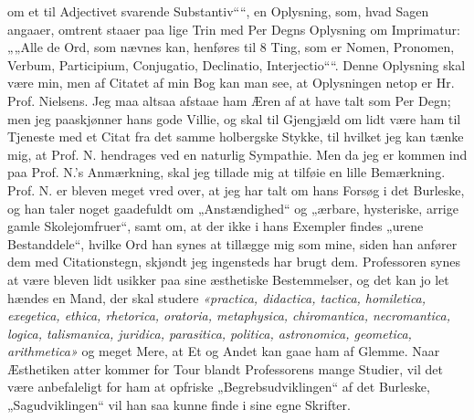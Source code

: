 \documentclass[12pt,a4paper]{book}
\newcommand{\opage}[1]{\marginnote{\footnotesize\textit{[#1]}}}
\begin{document}
om et til Adjectivet svarende Substantiv““, en Oplysning, som, hvad Sagen
angaaer, omtrent staaer paa lige Trin med Per Degns Oplysning om Imprimatur:
„„Alle de Ord, som nævnes kan, henføres til 8 Ting, som er Nomen, Pronomen,
Verbum, Participium, Conjugatio, Declinatio, Interjectio““. Denne Oplysning skal
være min, men af Citatet af min Bog kan man see, at Oplysningen netop er Hr.
Prof. Nielsens. Jeg maa altsaa afstaae ham Æren af at have talt som Per Degn; men
jeg paaskjønner hans gode Villie, og skal til Gjengjæld om lidt være ham til
Tjeneste med et Citat fra det samme holbergske Stykke, til hvilket jeg kan tænke
mig, at Prof. N. hendrages ved en naturlig Sympathie. Men da jeg er kommen ind
paa Prof. N.'s Anmærkning, skal jeg tillade mig at tilføie en lille Bemærkning.
Prof. N. er bleven meget vred over, at jeg har talt om hans Forsøg i det
Burleske, og han taler noget gaadefuldt om „Anstændighed“ og „ærbare, hysteriske,
arrige gamle Skolejomfruer“, samt om, at der ikke i hans Exempler findes „urene
Bestanddele“, hvilke Ord han synes at tillægge mig som mine, siden han anfører
dem med Citationstegn, skjøndt jeg ingensteds har brugt dem. Professoren synes
\opage{21} at være bleven lidt usikker paa sine æsthetiske Bestemmelser, og det kan jo let
hændes en Mand, der skal studere \textit{«practica, didactica, tactica,
homiletica, exegetica, ethica, rhetorica, oratoria, metaphysica, chiromantica,
necromantica, logica, talismanica, juridica, parasitica, politica, astronomica,
geometica, arithmetica»} og meget Mere, at Et og Andet kan gaae ham af Glemme.
Naar Æsthetiken atter kommer for Tour blandt Professorens mange Studier, vil det
være anbefaleligt for ham at opfriske „Begrebsudviklingen“ af det Burleske,
„Sagudviklingen“ vil han saa kunne finde i sine egne Skrifter.
\end{document}

